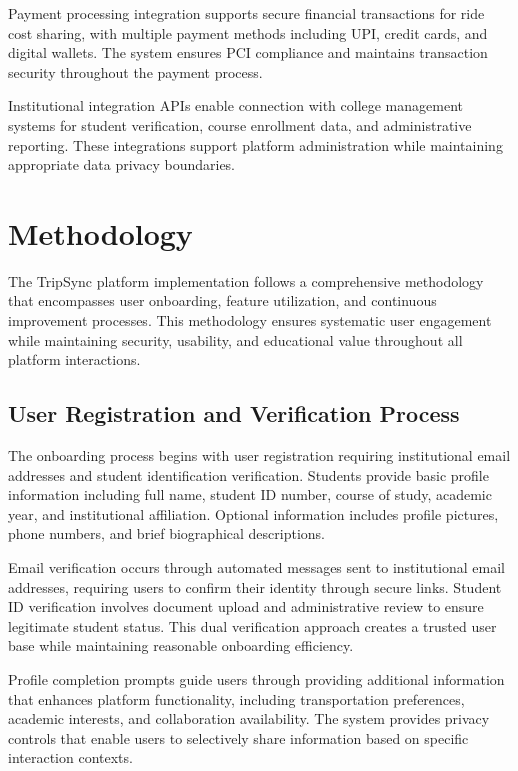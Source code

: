 \documentclass[conference]{IEEEtran}
\begin{document}
Payment processing integration supports secure financial transactions for ride cost sharing, with multiple payment methods including UPI, credit cards, and digital wallets. The system ensures PCI compliance and maintains transaction security throughout the payment process.

Institutional integration APIs enable connection with college management systems for student verification, course enrollment data, and administrative reporting. These integrations support platform administration while maintaining appropriate data privacy boundaries.

\section{Methodology}

The TripSync platform implementation follows a comprehensive methodology that encompasses user onboarding, feature utilization, and continuous improvement processes. This methodology ensures systematic user engagement while maintaining security, usability, and educational value throughout all platform interactions.

\subsection{User Registration and Verification Process}

The onboarding process begins with user registration requiring institutional email addresses and student identification verification. Students provide basic profile information including full name, student ID number, course of study, academic year, and institutional affiliation. Optional information includes profile pictures, phone numbers, and brief biographical descriptions.

Email verification occurs through automated messages sent to institutional email addresses, requiring users to confirm their identity through secure links. Student ID verification involves document upload and administrative review to ensure legitimate student status. This dual verification approach creates a trusted user base while maintaining reasonable onboarding efficiency.

Profile completion prompts guide users through providing additional information that enhances platform functionality, including transportation preferences, academic interests, and collaboration availability. The system provides privacy controls that enable users to selectively share information based on specific interaction contexts.
\end{document}
